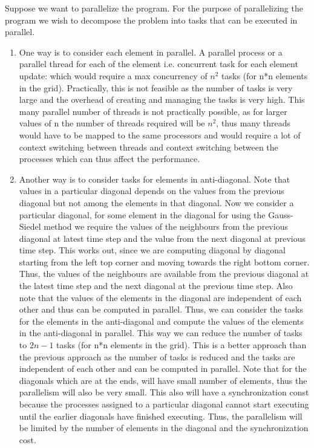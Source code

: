 \documentclass[12pt]{book}
\begin{document}
Suppose we want to parallelize the program. For the purpose of parallelizing the program we wish to decompose the problem into tasks that can be executed in parallel.
\begin{enumerate}
\item One way is to consider each element in parallel. A parallel process or a parallel thread for each of the element i.e. concurrent task for each element update:
which would require a max concurrency of $n^2$ tasks (for n*n elements in the grid). Practically, this is not feasible as the number of tasks is very large and the overhead of creating and managing the tasks is very high. This many parallel number of threads is not practically possible,
as for larger values of n the number of threads required will be $n^2$, thus many threads would have to be mapped to the same processors and would require a lot of context switching between threads and context switching between the processes which can thus affect the performance.
\item Another way is to consider tasks for elements in anti-diagonal. Note that values in a particular diagonal depends on the values from the previous diagonal but not among the elements in that diagonal.
Now we consider a particular diagonal, for some element in the diagonal for using the Gauss-Siedel method we require the values of the neighbours from the previous diagonal at latest time step and the value from the next diagonal at previous time step. This works out, since we are computing diagonal by diagonal 
starting from the left top corner and moving towards the right bottom corner. Thus, the values of the neighbours are available from the previous diagonal at the latest time step and the next diagonal at the previous time step. Also note that the values of the elements in the diagonal are independent of each other and thus can be computed in parallel.
Thus, we can consider the tasks for the elements in the anti-diagonal and compute the values of the elements in the anti-diagonal in parallel. This way we can reduce the number of tasks to $2n-1$ tasks (for n*n elements in the grid). This is a better approach than the previous approach as the number of tasks is reduced and the tasks are independent of each other and can be computed in parallel.
Note that for the diagonals which are at the ends, will have small number of elements, thus the parallelism will also be very small. This also will have a synchronization const because the processes assigned to a particular diagonal cannot start executing until the earlier diagonals
have finished executing. Thus, the parallelism will be limited by the number of elements in the diagonal and the synchronization cost.

\end{enumerate}
\end{document}

